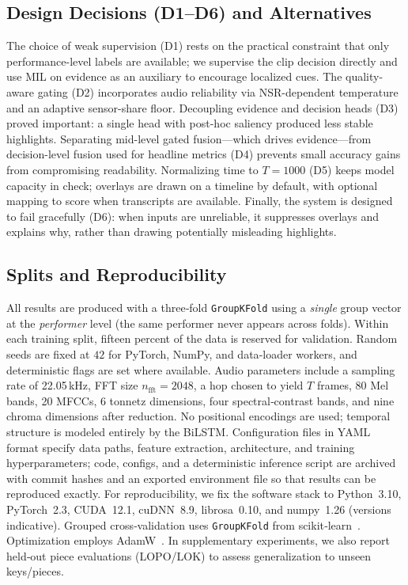 \documentclass[sigconf,review,anonymous]{acmart}
\begin{document}
\subsection{Design Decisions (D1–D6) and Alternatives}
\label{subsec:design}
The choice of weak supervision (D1) rests on the practical constraint that only performance-level labels are available; we supervise the clip decision directly and use MIL on evidence as an auxiliary to encourage localized cues. The quality-aware gating (D2) incorporates audio reliability via NSR-dependent temperature and an adaptive sensor-share floor. Decoupling evidence and decision heads (D3) proved important: a single head with post-hoc saliency produced less stable highlights. Separating mid-level gated fusion—which drives evidence—from decision-level fusion used for headline metrics (D4) prevents small accuracy gains from compromising readability. Normalizing time to $T{=}1000$ (D5) keeps model capacity in check; overlays are drawn on a timeline by default, with optional mapping to score when transcripts are available. Finally, the system is designed to fail gracefully (D6): when inputs are unreliable, it suppresses overlays and explains why, rather than drawing potentially misleading highlights.

\subsection{Splits and Reproducibility}
All results are produced with a three‑fold \texttt{GroupKFold} using a \emph{single} group vector at the \emph{performer} level (the same performer never appears across folds). Within each training split, fifteen percent of the data is reserved for validation. Random seeds are fixed at $42$ for PyTorch, NumPy, and data‑loader workers, and deterministic flags are set where available. Audio parameters include a sampling rate of 22.05\,kHz, FFT size $n_{\text{fft}}{=}2048$, a hop chosen to yield $T$ frames, 80 Mel bands, 20 MFCCs, 6 tonnetz dimensions, four spectral‑contrast bands, and nine chroma dimensions after reduction. No positional encodings are used; temporal structure is modeled entirely by the BiLSTM. Configuration files in YAML format specify data paths, feature extraction, architecture, and training hyperparameters; code, configs, and a deterministic inference script are archived with commit hashes and an exported environment file so that results can be reproduced exactly. For reproducibility, we fix the software stack to Python~3.10, PyTorch~2.3, CUDA~12.1, cuDNN~8.9, librosa~0.10, and numpy~1.26 (versions indicative). Grouped cross‑validation uses \texttt{GroupKFold} from scikit‑learn~\cite{Pedregosa2011Scikit}. Optimization employs AdamW~\cite{LoshchilovHutter2019AdamW}. In supplementary experiments, we also report held‑out piece evaluations (LOPO/LOK) to assess generalization to unseen keys/pieces.
\end{document}
